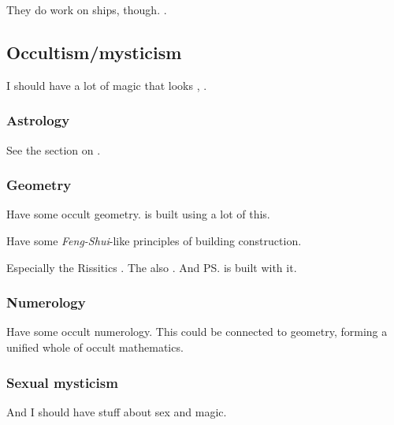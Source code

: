 They do work on ships, though. 
. 









\subsection{Occultism/mysticism}
I should have a lot of magic that looks , . 





\subsubsection{Astrology}
See the section on .





\subsubsection{Geometry}
Have some occult geometry. 
 is built using a lot of this.

Have some \emph{Feng-Shui}-like principles of building construction. 

Especially the Rissitics . 
The \Ortaicans{} also . 
And \ps{\Ishnaruchaefir}  is built with it. 





\subsubsection{Numerology}
Have some occult numerology. This could be connected to geometry, forming a unified whole of occult mathematics.





\subsubsection{Sexual mysticism}
And I should have stuff about sex and magic. 







